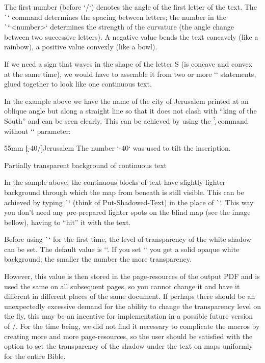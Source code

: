 {{The first number (before `/`) denotes the angle of the first letter of the text.
The \`\kern` command determines the spacing between letters; the number in the \`\pdfrotate``{<number>}` 
determines the strength of the curvature (the angle change between two successive letters). A negative value bends the text concavely 
(like a rainbow), a positive value convexly (like a bowl).

If we need a sign that waves in the shape of the letter S (is concave and convex at 
the same time), we would have to assemble it from two or more `\puttext` statements, glued 
together to look like one continuous text. 


In the example above we have the name of the city of Jerusalem printed at an oblique angle but along a straight line so that it 
does not clash with “king of the South” and can be seen clearly.
This can be achieved by using the \`\c` command without `\pdfrotate` parameter:

\begtt
\puttext 48mm 55mm {\c[-40/\kern1pt]{Jerusalem}}
\endtt
The number `-40` was used to tilt the inscription.


\secc[bkgrnd] Partially transparent background of continuous text

In the sample above, the continuous blocks of text have slightly lighter background 
through which the map from beneath is still visible.
This can be achieved by typing \`\putstext` (think of Put-Shadowed-Text) in the place of 
\`\puttext`. This way you don't need any pre-prepared lighter spots on the blind map (see the 
image bellow), having to “hit” it with the text. 


\medskip
\centerline{\picw=150pt }

\smallskip

Before using \`\putstext` for the first time, the level of transparency of the white shadow can be set.  The default value is `\def\shadowparameter{.1}`. 
If you set `\def\shadowparameter{1}` you get a solid opaque white background; the smaller the number the more transparency. 

However, this value is then stored in the page-resources of the output PDF and is used 
the same  on all subsequent pages, so you cannot change it and have it  different in 
different places of the same document. 
If perhaps there should be an unexpectedly excessive 
demand for the ability to change the transparency level on the fly, this may be an incentive for 
implementation in a possible future version of \OpBible/.
For the time being, we did not find it necessary to complicate the macros by creating more and more 
page-resources, so the user should be satisfied with the option to set the transparency of the 
shadow under the text on maps uniformly for the entire Bible.  


}}
